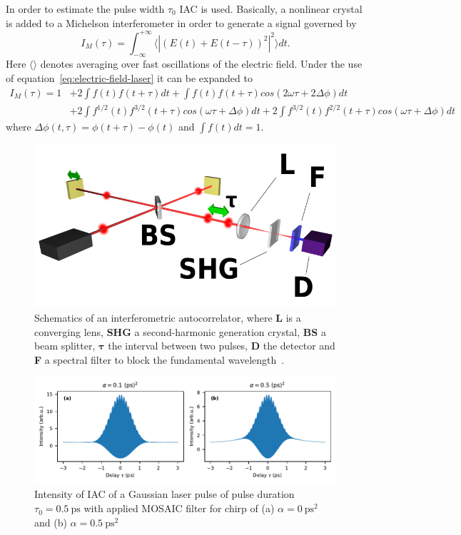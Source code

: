 In order to estimate the pulse width $\tau_0$ \ac{IAC} is used.
Basically, a nonlinear crystal is added to a Michelson interferometer in order to generate a signal governed by~\cite{diels_ultrashort_2006}
\begin{equation}
\label{eq:i-m-integral}
I_M(\tau) = \int_{-\infty}^{+\infty}\langle|(E(t)+E(t-\tau))^2|^2\rangle dt.
\end{equation}
Here $\langle \rangle$ denotes averaging over fast oscillations of the electric field.
Under the use of equation~\ref{eq:electric-field-laser} it can be expanded to
\begin{align}
I_M(\tau) = 1 &+ 2 \int f(t) f(t + \tau) dt + \int f(t) f(t + \tau) cos(2 \omega \tau + 2 \Delta \phi) dt \nonumber\\
&+ 2 \int f^{1/2}(t) f^{3/2}(t + \tau) cos(\omega \tau + \Delta \phi) dt + 2 \int f^{3/2}(t) f^{2/2}(t + \tau) cos(\omega \tau + \Delta \phi) dt
\end{align}
where $\Delta \phi(t, \tau) = \phi(t + \tau) - \phi(t)$ and $\int f(t) dt = 1$.
\begin{figure}[H]
	\centering
	\includegraphics[width=0.6\linewidth]{figures/chirp/Optical-interferometric-autocorrelation-setup.png}
	\caption[Schematics of an interferometric autocorrelator]{Schematics of an interferometric autocorrelator, where \textbf{L} is a converging lens, \textbf{SHG} a second-harmonic generation crystal, \textbf{BS} a beam splitter, $\mathbf{\tau}$ the interval between two pulses, \textbf{D} the detector and \textbf{F} a spectral filter to block the fundamental wavelength~\cite{noauthor_optical_nodate}.}
	\label{fig:optical-field-autocorrelation-setup}
\end{figure}
\begin{figure}[H]
	\centering
	\includegraphics[width=\linewidth]{figures/chirp/plots/I_M_gauss_chirp_without_slit_without_MOSAIC}
	\caption{Intensity of IAC of a Gaussian laser pulse of pulse duration $\tau_0=\SI{0.5}{\pico \second}$ with applied MOSAIC filter for chirp of (a) $\alpha = \SI{0}{\pico \second \squared}$ and (b) $\alpha = \SI{0.5}{\pico \second \squared}$}
	\label{fig:imgausschirpwithoutslitwithoutmosaic}
\end{figure}


